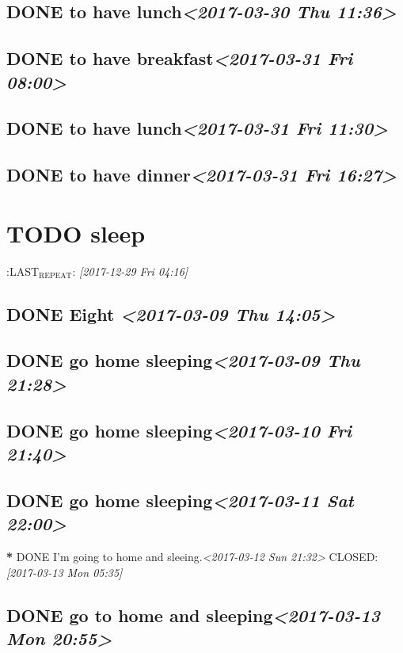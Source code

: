 \documentclass[cyan]{elegantnote}
\begin{document}
\section{{\bfseries\sffamily DONE} to have lunch\textit{<2017-03-30 Thu 11:36>}}
\label{sec:org5dbcbcc}
\section{{\bfseries\sffamily DONE} to have breakfast\textit{<2017-03-31 Fri 08:00>}}
\label{sec:org8608956}
\section{{\bfseries\sffamily DONE} to have lunch\textit{<2017-03-31 Fri 11:30>}}
\label{sec:orgd102c24}
\section{{\bfseries\sffamily DONE} to have dinner\textit{<2017-03-31 Fri 16:27>}}
\label{sec:orgc58c758}
\chapter{{\bfseries\sffamily TODO} sleep}
\label{sec:org68fc30c}
:LAST\(_{\text{REPEAT}}\): \textit{[2017-12-29 Fri 04:16]}
\section{{\bfseries\sffamily DONE} Eight \textit{<2017-03-09 Thu 14:05>}}
\label{sec:org961af87}
\section{{\bfseries\sffamily DONE} go home sleeping\textit{<2017-03-09 Thu 21:28>}}
\label{sec:orga543790}
\section{{\bfseries\sffamily DONE} go home sleeping\textit{<2017-03-10 Fri 21:40>}}
\label{sec:org104e4a9}
\section{{\bfseries\sffamily DONE} go home sleeping\textit{<2017-03-11 Sat 22:00>}}
\label{sec:org4b2d9af}
\textbf{\textbf{*}}
 DONE I'm going to home and sleeing.\textit{<2017-03-12 Sun 21:32>}
   CLOSED: \textit{[2017-03-13 Mon 05:35]}
\section{{\bfseries\sffamily DONE} go to home and sleeping\textit{<2017-03-13 Mon 20:55>}}
\label{sec:org1b2df4f}
\end{document}
